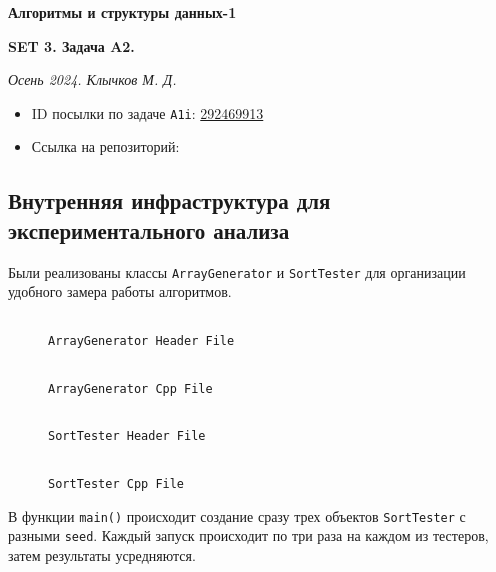 \documentclass[11pt,a4paper]{scrarticle}
\author{Клычков Максим Дмитриевич}
\theoremstyle{definition}
\begin{document}
\centerline{\textbf{\huge Алгоритмы и структуры данных-1}}
\centerline{\textbf{SET 3. Задача A2.}}
\begin{flushright}
	\emph{Осень 2024. Клычков М. Д.}
\end{flushright}

\begin{itemize}
	\item ID посылки по задаче \texttt{A1i}: \href{https://dsahse.contest.codeforces.com/group/NOflOR1Qt0/contest/565612/submission/292469913}{292469913}
	\item Ссылка на репозиторий:
\end{itemize}

\subsection*{Внутренняя инфраструктура для экспериментального анализа}

Были реализованы классы \texttt{ArrayGenerator} и \texttt{SortTester} для организации удобного замера работы алгоритмов.

\begin{figure}[htp]
	\centering
	\inputminted[linenos,fontsize=\small]{cpp}{../analyze/generator.h}
	\caption{\texttt{ArrayGenerator Header File}}
	\label{code:generator-h}
\end{figure}
\FloatBarrier

\begin{figure}[htp]
	\centering
	\inputminted[linenos,fontsize=\small]{cpp}{../analyze/generator.cpp}
	\caption{\texttt{ArrayGenerator Cpp File}}
	\label{code:generator-cpp}
\end{figure}
\FloatBarrier

\begin{figure}[htp]
	\centering
	\inputminted[linenos,fontsize=\small]{cpp}{../analyze/tester.h}
	\caption{\texttt{SortTester Header File}}
	\label{code:tester-h}
\end{figure}
\FloatBarrier

\begin{figure}[htp]
	\centering
	\inputminted[linenos,fontsize=\small]{cpp}{../analyze/tester.cpp}
	\caption{\texttt{SortTester Cpp File}}
	\label{code:tester-cpp}
\end{figure}
\FloatBarrier

В функции \texttt{main()} происходит создание сразу трех объектов \texttt{SortTester} с разными \texttt{seed}. Каждый запуск происходит по три раза на каждом из тестеров, затем результаты усредняются.
\end{document}
